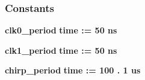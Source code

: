 \subsubsection*{Constants}
 \begin{DoxyCompactItemize}
\item 
{\bf clk0\+\_\+period} {\bfseries \textcolor{comment}{time}\textcolor{vhdlchar}{ }\textcolor{vhdlchar}{ }\textcolor{vhdlchar}{\+:}\textcolor{vhdlchar}{=}\textcolor{vhdlchar}{ }\textcolor{vhdlchar}{ }\textcolor{vhdlchar}{ } \textcolor{vhdldigit}{50} \textcolor{vhdlchar}{ }\textcolor{vhdlchar}{ns}\textcolor{vhdlchar}{ }} 
\item 
{\bf clk1\+\_\+period} {\bfseries \textcolor{comment}{time}\textcolor{vhdlchar}{ }\textcolor{vhdlchar}{ }\textcolor{vhdlchar}{\+:}\textcolor{vhdlchar}{=}\textcolor{vhdlchar}{ }\textcolor{vhdlchar}{ }\textcolor{vhdlchar}{ } \textcolor{vhdldigit}{50} \textcolor{vhdlchar}{ }\textcolor{vhdlchar}{ns}\textcolor{vhdlchar}{ }} 
\item 
{\bf chirp\+\_\+period} {\bfseries \textcolor{comment}{time}\textcolor{vhdlchar}{ }\textcolor{vhdlchar}{ }\textcolor{vhdlchar}{\+:}\textcolor{vhdlchar}{=}\textcolor{vhdlchar}{ }\textcolor{vhdlchar}{ }\textcolor{vhdlchar}{ } \textcolor{vhdldigit}{100} \textcolor{vhdlchar}{.} \textcolor{vhdldigit}{1} \textcolor{vhdlchar}{ }\textcolor{vhdlchar}{us}\textcolor{vhdlchar}{ }} 
\end{DoxyCompactItemize}
